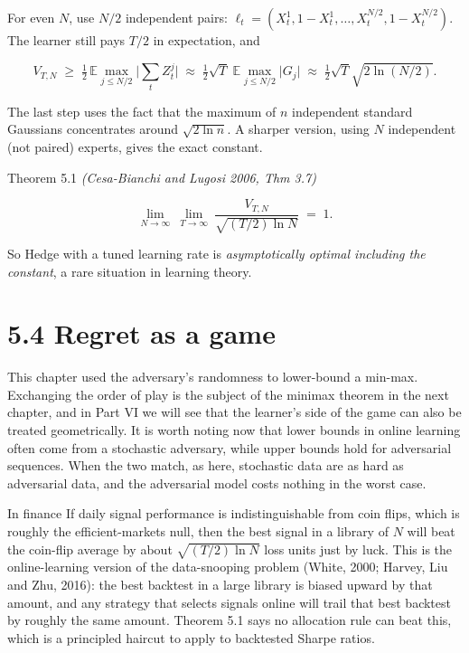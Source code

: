 \documentclass[11pt,a4paper,openany]{book}
\newcommand{\E}{\mathbb{E}}
\newcommand{\abs}[1]{\lvert #1\rvert}
\begin{document}
For even $N$, use $N/2$ independent pairs: $\ell_t=(X^1_t,1-X^1_t,\dots,X^{N/2}_t,1-X^{N/2}_t)$. The learner still pays $T/2$ in expectation, and

\[V_{T,N}\;\ge\;\tfrac12\,\E\max_{j\le N/2}\Big\lvert\sum_tZ^j_t\Big\rvert\;\approx\;\tfrac12\sqrt T\;\E\max_{j\le N/2}\abs{G_j}\;\approx\;\tfrac12\sqrt{T}\sqrt{2\ln(N/2)}.\]

The last step uses the fact that the maximum of $n$ independent standard Gaussians concentrates around $\sqrt{2\ln n}$. A sharper version, using $N$ independent (not paired) experts, gives the exact constant.

\begin{bthm}{Theorem 5.1 \emph{(Cesa-Bianchi and Lugosi 2006, Thm 3.7)}}

\[\lim_{N\to\infty}\ \lim_{T\to\infty}\ \frac{V_{T,N}}{\sqrt{(T/2)\ln N}}\;=\;1.\]

\end{bthm}

So Hedge with a tuned learning rate is \emph{asymptotically optimal including the constant}, a rare situation in learning theory.

\section*{5.4 Regret as a game}\label{ch5-game}

This chapter used the adversary's randomness to lower-bound a min-max. Exchanging the order of play is the subject of the minimax theorem in the next chapter, and in Part VI we will see that the learner's side of the game can also be treated geometrically. It is worth noting now that lower bounds in online learning often come from a stochastic adversary, while upper bounds hold for adversarial sequences. When the two match, as here, stochastic data are as hard as adversarial data, and the adversarial model costs nothing in the worst case.

\begin{bfin}{In finance}
If daily signal performance is indistinguishable from coin flips, which is roughly the efficient-markets null, then the best signal in a library of $N$ will beat the coin-flip average by about $\sqrt{(T/2)\ln N}$ loss units just by luck. This is the online-learning version of the data-snooping problem (White, 2000; Harvey, Liu and Zhu, 2016): the best backtest in a large library is biased upward by that amount, and any strategy that selects signals online will trail that best backtest by roughly the same amount. Theorem 5.1 says no allocation rule can beat this, which is a principled haircut to apply to backtested Sharpe ratios.
\end{bfin}
\end{document}
